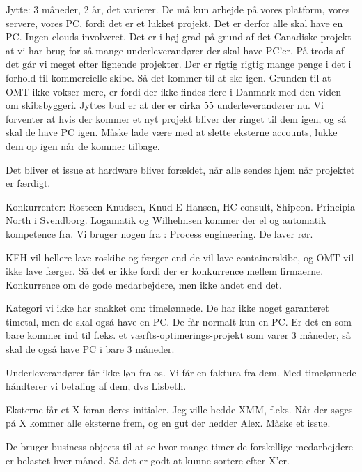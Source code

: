 \begin{linenumbers*}
Jytte:
3 måneder, 2 år, det varierer. De må kun arbejde på vores platform, 
vores servere, vores PC, fordi det er et lukket projekt.
Det er derfor alle skal have en PC. Ingen clouds involveret.
Det er i høj grad på grund af det Canadiske projekt
at vi har brug for så mange underleverandører der skal have PC’er. 
På trods af det går vi meget efter lignende projekter.
Der er rigtig rigtig mange penge i det i forhold til kommercielle skibe.
Så det kommer til at ske igen.
Grunden til at OMT ikke vokser mere, er fordi der ikke findes flere i Danmark
med den viden om skibsbyggeri. 
Jyttes bud er at der er cirka 55 underleverandører nu.
Vi forventer at hvis der kommer et nyt projekt bliver der ringet til dem igen,
og så skal de have PC igen.
Måske lade være med at slette eksterne accounts,
lukke dem op igen når de kommer tilbage.

Det bliver et issue at hardware bliver forældet,
når alle sendes hjem når projektet er færdigt.

Konkurrenter:
Rosteen Knudsen, Knud E Hansen, HC consult, Shipcon. Principia North i Svendborg. 
Logamatik og Wilhelmsen kommer der el og automatik kompetence fra.
Vi bruger nogen fra : Process engineering. De laver rør.

KEH vil hellere lave roskibe og færger end de vil lave containerskibe,
og OMT vil ikke lave færger. Så det er ikke fordi der er konkurrence mellem
firmaerne. 
Konkurrence om de gode medarbejdere, men ikke andet end det.

Kategori vi ikke har snakket om: timelønnede.
De har ikke noget garanteret timetal, men de skal også have en PC.
De får normalt kun en PC. Er det en som bare kommer ind til f.eks.
et værfts-optimerings-projekt som varer 3 måneder,
så skal de også have PC i bare 3 måneder.

Underleverandører får ikke løn fra os. Vi får en faktura fra dem. 
Med timelønnede håndterer vi betaling af dem, dvs Lisbeth.

Eksterne får et X foran deres initialer. Jeg ville hedde XMM, f.eks.
Når der søges på X kommer alle eksterne frem, og en gut der hedder Alex.
Måske et issue.

De bruger business objects til at se hvor mange timer
de forskellige medarbejdere er belastet hver måned.
Så det er godt at kunne sortere efter X’er.
\end{linenumbers*}